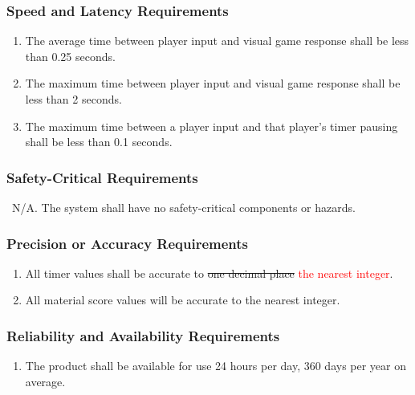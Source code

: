 \documentclass[12pt, titlepage]{article}
\begin{document}
    \subsubsection{Speed and Latency Requirements}
    \begin{enumerate}[{PR}1., leftmargin=2\parindent]
    	\item The average time between player input and visual game response shall be less than 0.25 seconds.
    	\item The maximum time between player input and visual game response shall be less than 2 seconds.
    	\item The maximum time between a player input and that player's timer pausing shall be less than 0.1 seconds.
    \end{enumerate}
    
    \subsubsection{Safety-Critical Requirements}
    \ N/A. The system shall have no safety-critical components or hazards.
    
    \subsubsection{Precision or Accuracy Requirements}
    \begin{enumerate}[{PR}1., leftmargin=2\parindent, resume]
    	\item All timer values shall be accurate to \sout{one decimal place} \textcolor{red}{the nearest integer}.
    	\item All material score values will be accurate to the nearest integer.
    \end{enumerate}
    
    \subsubsection{Reliability and Availability Requirements}
    \begin{enumerate}[{PR}1., leftmargin=2\parindent, resume]
    	\item The product shall be available for use 24 hours per day, 360 days per year on average.
    \end{enumerate}
    
\end{document}

